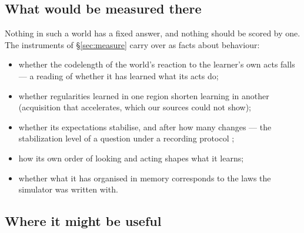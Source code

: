 \documentclass[11pt,a4paper]{article}
\theoremstyle{plain}
\theoremstyle{definition}
\theoremstyle{remark}
\begin{document}
\subsection{What would be measured there}

Nothing in such a world has a fixed answer, and nothing should be scored by
one. The instruments of \S\ref{sec:measure} carry over as facts about behaviour:
\begin{itemize}
\item whether the codelength of the world's reaction to the learner's own acts
falls --- a reading of whether it has learned what its acts do;
\item whether regularities learned in one region shorten learning in another
(acquisition that accelerates, which our sources could not show);
\item whether its expectations stabilise, and after how many changes --- the
stabilization level of a question under a recording protocol
\citep{yang2026gluing};
\item how its own order of looking and acting shapes what it learns;
\item whether what it has organised in memory corresponds to the laws the
simulator was written with.
\end{itemize}

\subsection{Where it might be useful}
\end{document}

